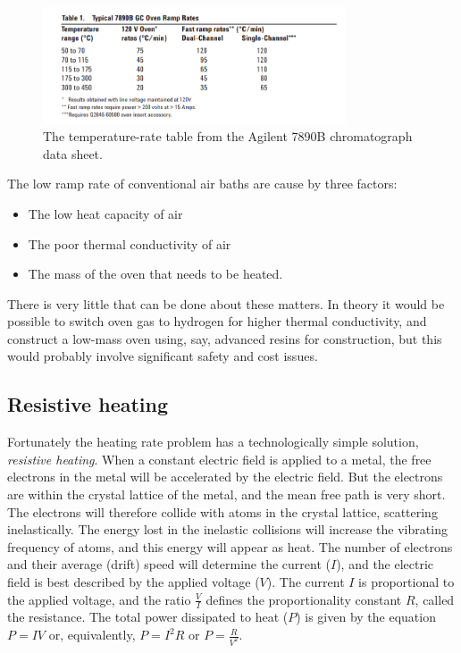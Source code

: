 \begin{figure}
	\centering
	\includegraphics[width=0.8\textwidth,natwidth=4.17in,natheight=3.32in]{Figures/7890B.png}
	\decoRule
\caption[A temperature-rate table from the Agilent7890B data sheet]{The temperature-rate table from the Agilent 7890B chromatograph data sheet\autocite{7890B}. }
\label{fig:RampRate7890B}
\end{figure}


The low ramp rate of conventional air baths are cause by three factors:

\begin{itemize}
	\item The low heat capacity of air
	\item The poor thermal conductivity of air
	\item The mass of the oven that needs to be heated. 
\end{itemize}

There is very little that can be done about these matters. In theory it would be
possible to switch oven gas to hydrogen for higher thermal conductivity, and
construct a low-mass oven using, say, advanced resins for construction, but this
would probably involve significant safety and cost issues. 

\subsection{Resistive heating}

Fortunately the heating rate problem has a technologically simple solution,
\textit{resistive heating}. When a constant electric field is applied to a metal, the
free electrons in the metal will be accelerated by the electric field. But the
electrons are within the crystal lattice of the metal, and the mean free path is
very short. The electrons will therefore collide with atoms in the crystal
lattice, scattering inelastically. The energy lost in the inelastic collisions
will increase the vibrating frequency of atoms, and this energy will appear as
heat. The number of electrons and their average (drift) speed will determine the
current ($I$), and the electric field is best described by the applied voltage
($V$). The current $I$ is proportional to the applied voltage, and the ratio
$\frac{V}{I}$ defines the proportionality constant $R$, called the resistance.
The total power dissipated to heat ($P$) is given by the equation $P=IV$ or,
equivalently, $P=I^2R$ or $P=\frac{R}{V^2}$.

